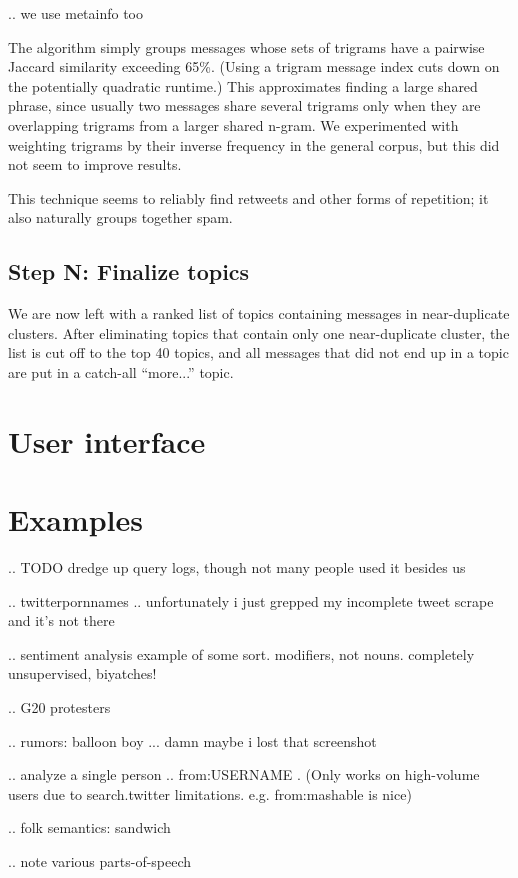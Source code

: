 \documentclass[letterpaper]{article}
\begin{document}
.. we use metainfo too

The algorithm simply groups messages whose sets of trigrams have a pairwise Jaccard similarity exceeding 65\%.  (Using a trigram message index cuts down on the potentially quadratic runtime.)  This approximates finding a large shared phrase, since usually two messages share several trigrams only when they are overlapping trigrams from a larger shared n-gram.  We experimented with weighting trigrams by their inverse frequency in the general corpus, but this did not seem to improve results.   

This technique seems to reliably find retweets and other forms of repetition; it also naturally groups together spam.


\subsection{Step N: Finalize topics}

We are now left with a ranked list of topics containing messages in near-duplicate clusters.  After eliminating topics that contain only one near-duplicate cluster, the list is cut off to the top 40 topics, and all messages that did not end up in a topic are put in a catch-all ``more...'' topic.

\section{User interface}

\section{Examples}

.. TODO dredge up query logs, though not many people used it besides us

.. twitterpornnames .. unfortunately i just grepped my incomplete tweet scrape and it's not there

.. sentiment analysis example of some sort.  modifiers, not nouns.  completely unsupervised, biyatches!

.. G20 protesters

.. rumors: balloon boy ... damn maybe i lost that screenshot

.. analyze a single person .. from:USERNAME .   (Only works on high-volume users due to search.twitter limitations.  e.g. from:mashable is nice)

.. folk semantics: sandwich

.. note various parts-of-speech
\end{document}

